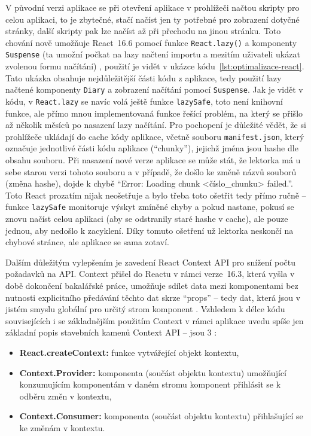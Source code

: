 V původní verzi aplikace se při otevření aplikace v prohlížeči načtou skripty pro celou aplikaci, to je zbytečné, stačí načíst jen ty potřebné pro zobrazení dotyčné stránky, další skripty pak lze načíst až při přechodu na jinou stránku. Toto chování nově umožňuje React~16.6 pomocí funkce \verb|React.lazy()| a komponenty \verb|Suspense| (ta umožní počkat na lazy načtení importu a mezitím uživateli ukázat zvolenou formu načítání) \cite{react-blog-166}, použití je vidět v ukázce kódu~\ref{lst:optimalizace-react}. Tato ukázka obsahuje nejdůležitější části kódu z aplikace, tedy použití lazy načtené komponenty \verb|Diary| a zobrazení načítání pomocí \verb|Suspense|. Jak je vidět v kódu, v \verb|React.lazy| se navíc volá ještě funkce \verb|lazySafe|, toto není knihovní funkce, ale přímo mnou implementovaná funkce řešící problém, na který se přišlo až několik měsíců po nasazení lazy načítání. Pro pochopení je důležité vědět, že si prohlížeče ukládají do cache kódy aplikace, včetně souboru \verb|manifest.json|, který označuje jednotlivé části kódu aplikace (\enquote{chunky}), jejichž jména jsou hashe dle obsahu souboru. Při nasazení nové verze aplikace se může stát, že lektorka má u sebe starou verzi tohoto souboru a v případě, že došlo ke změně názvů souborů (změna hashe), dojde k chybě \enquote{Error: Loading chunk <číslo\_chunku> failed.}. Toto React prozatím nijak neošetřuje a bylo třeba toto ošetřit tedy přímo ručně -- funkce \verb|lazySafe| monitoruje výskyt zmíněné chyby a pokud nastane, pokusí se znovu načíst celou aplikaci (aby se odstranily staré hashe v cache), ale pouze jednou, aby nedošlo k zacyklení. Díky tomuto ošetření už lektorka neskončí na chybové stránce, ale aplikace se sama zotaví.

Dalším důležitým vylepšením je zavedení React Context API pro snížení počtu požadavků na API. Context přišel do Reactu v rámci verze~16.3, která vyšla v době dokončení bakalářské práce, umožňuje sdílet data mezi komponentami bez nutnosti explicitního předávání těchto dat skrze \enquote{props} -- tedy dat, která jsou v jistém smyslu globální pro určitý strom komponent \cite{react-context}. Vzhledem k délce kódu souvisejících i se základnějším použitím Context v rámci aplikace uvedu spíše jen základní popis stavebních kamenů Context API -- jsou 3 \cite{react-context}:
\begin{itemize}
    \item \textbf{React.createContext:} funkce vytvářející objekt kontextu,
    \item \textbf{Context.Provider:} komponenta (součást objektu kontextu) umožňující konzumujícím komponentám v daném stromu komponent přihlásit se k odběru změn v kontextu,
    \item \textbf{Context.Consumer:} komponenta (součást objektu kontextu) přihlašující se ke změnám v kontextu.
\end{itemize}

